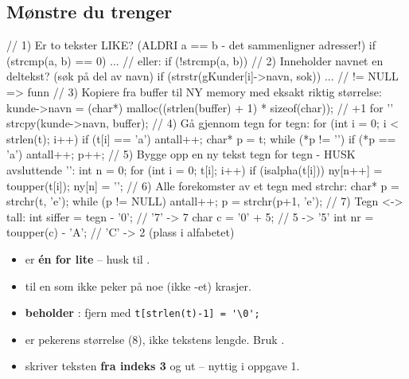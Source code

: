 \subsection{Mønstre du trenger}
\begin{kode}
//  1) Er to tekster LIKE?   (ALDRI  a == b  -  det sammenligner adresser!)
if (strcmp(a, b) == 0)  ...          //  eller:  if (!strcmp(a, b))
//  2) Inneholder navnet en deltekst?   (søk på del av navn)
if (strstr(gKunder[i]->navn, sok))  ...      //  != NULL  =>  funn
//  3) Kopiere fra buffer til NY memory med eksakt riktig størrelse:
kunde->navn = (char*) malloc((strlen(buffer) + 1) * sizeof(char));   //  +1 for '\0'
strcpy(kunde->navn, buffer);
//  4) Gå gjennom tegn for tegn:
for (int i = 0;  i < strlen(t);  i++)   if (t[i] == 'a')  antall++;
char* p = t;   while (*p != '\0')  { if (*p == 'a') antall++;  p++; }
//  5) Bygge opp en ny tekst tegn for tegn - HUSK avsluttende '\0':
int n = 0;
for (int i = 0;  t[i];  i++)   if (isalpha(t[i]))  ny[n++] = toupper(t[i]);
ny[n] = '\0';
//  6) Alle forekomster av et tegn med strchr:
char* p = strchr(t, 'e');
while (p != NULL)  {  antall++;   p = strchr(p+1, 'e');  }
//  7) Tegn <-> tall:
int siffer = tegn - '0';       //  '7' -> 7
char c     = '0' + 5;          //  5   -> '5'
int nr     = toupper(c) - 'A'; //  'C' -> 2  (plass i alfabetet)
\end{kode}

\begin{felle}
\begin{itemize}
  \item {} er \textbf{én for lite} -- husk  til .
  \item {} til en  som ikke peker på noe (ikke -et) krasjer.
  \item {} \textbf{beholder} : fjern med \lstinline|t[strlen(t)-1] = '\0';|
  \item {} er pekerens størrelse (8), ikke tekstens lengde. Bruk .
  \item {} skriver teksten \textbf{fra indeks 3} og ut -- nyttig i oppgave 1.
\end{itemize}
\end{felle}
